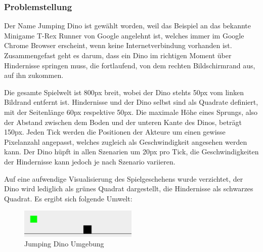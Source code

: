 \subsubsection{Problemstellung}
Der Name \glqq Jumping Dino\grqq{} ist gewählt worden, weil das Beispiel an das bekannte Minigame \glqq T-Rex Runner\grqq{} von Google angelehnt ist, welches immer im Google Chrome Browser erscheint, wenn keine Internetverbindung vorhanden ist. Zusammengefast geht es darum, dass ein Dino im richtigen Moment über Hindernisse springen muss, die fortlaufend, von dem rechten Bildschirmrand aus, auf ihn zukommen.
\par 
Die gesamte Spielwelt ist 800px breit, wobei der Dino stehts 50px vom linken Bildrand entfernt ist. Hindernisse und der Dino selbst sind als Quadrate definiert, mit der Seitenlänge 60px respektive 50px. Die maximale Höhe eines Sprungs, also der Abstand zwischen dem Boden und der unteren Kante des Dinos, beträgt 150px. Jeden Tick werden die Positionen der Akteure um einen gewisse Pixelanzahl angepasst, welches zugleich als Geschwindigkeit angesehen werden kann. Der Dino hüpft in allen Szenarien um 20px pro Tick, die Geschwindigkeiten der Hindernisse kann jedoch je nach Szenario variieren.
\par 
Auf eine aufwendige Visualisierung des Spielgeschehens wurde verzichtet, der Dino wird lediglich als grünes Quadrat dargestellt, die Hindernisse als schwarzes Quadrat. Es ergibt sich folgende Umwelt:
\begin{figure}[H]
    \begin{center}
    \includegraphics[width=0.5\textwidth]{images/jumpingDinoUmg.png}  \end{center}
    \caption{Jumping Dino Umgebung}
    \label{fig:2-Wege-2}
\end{figure}

